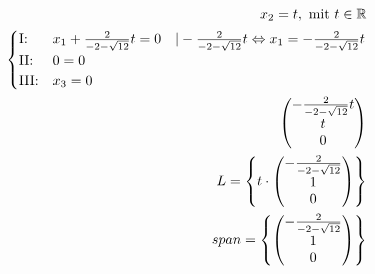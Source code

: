 \begin{align*}
    x_2 = t, \text{ mit } t \in \mathbb{R}                                                                                                                                    \\
    \begin{cases}
        \text{I:\@}   & x_1 + \frac{2}{-2-\sqrt{12}}t = 0 \quad | - \frac{2}{-2-\sqrt{12}}t \Leftrightarrow x_1 = -\frac{2}{-2-\sqrt{12}}t \\
        \text{II:\@}  & 0 = 0                                                                                                              \\
        \text{III:\@} & x_3 = 0
    \end{cases} \\
    \begin{pmatrix}
        -\frac{2}{-2-\sqrt{12}}t \\
        t                        \\
        0
    \end{pmatrix}                                                                                                                                     \\
    L = \left\{t \cdot \begin{pmatrix}
                           -\frac{2}{-2-\sqrt{12}} \\
                           1                       \\
                           0
                       \end{pmatrix}\right\}                                                                                                                   \\
    span = \left\{\begin{pmatrix}
                      -\frac{2}{-2-\sqrt{12}} \\
                      1                       \\
                      0
                  \end{pmatrix}\right\}
\end{align*}

